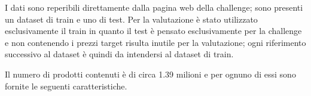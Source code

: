 
I dati sono reperibili direttamente dalla pagina web della challenge; sono
presenti un dataset di train e uno di test. Per la valutazione è stato utilizzato
esclusivamente il train in quanto il test è pensato esclusivamente per la
challenge e non contenendo i prezzi target risulta inutile per la valutazione;
ogni riferimento successivo al dataset è quindi da intendersi al dataset di train.

Il numero di prodotti contenuti è di circa 1.39 milioni e per ognuno di essi
sono fornite le seguenti caratteristiche.

